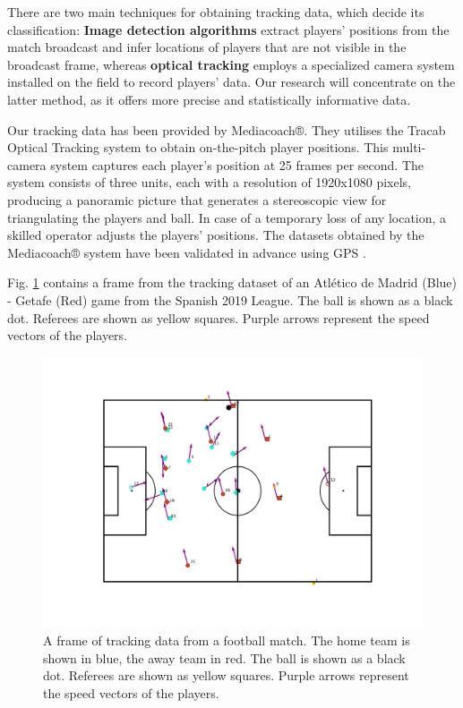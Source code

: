 \documentclass[
  10pt,
  twoside,nohyper]{book}
\begin{document}
There are two main techniques for obtaining tracking data, which decide its classification: \textbf{Image detection algorithms} extract players' positions from the match broadcast and infer locations of players that are not visible in the broadcast frame, whereas \textbf{optical tracking} employs a specialized camera system installed on the field to record players' data. Our research will concentrate on the latter method, as it offers more precise and statistically informative data.

Our tracking data has been provided by Mediacoach®. They utilises the Tracab Optical Tracking system to obtain on-the-pitch player positions. This multi-camera system captures each player's position at 25 frames per second. The system consists of three units, each with a resolution of 1920x1080 pixels, producing a panoramic picture that generates a stereoscopic view for triangulating the players and ball. In case of a temporary loss of any location, a skilled operator adjusts the players' positions. The datasets obtained by the Mediacoach® system have been validated in advance using GPS \autocite{Felipe2019ValidationOA}.

Fig. \ref{fig:frame} contains a frame from the tracking dataset of an Atlético de Madrid (Blue) - Getafe (Red) game from the Spanish 2019 League. The ball is shown as a black dot. Referees are shown as yellow squares. Purple arrows represent the speed vectors of the players.

\begin{figure}[H]

{\centering \includegraphics[width=0.8\linewidth,]{imagenes/Frame} 

}

\caption{A frame of tracking data from a football match. The home team is shown in blue, the away team in red. The ball is shown as a black dot. Referees are shown as yellow squares. Purple arrows represent the speed vectors of the players.}\label{fig:frame}
\end{figure}
\end{document}
